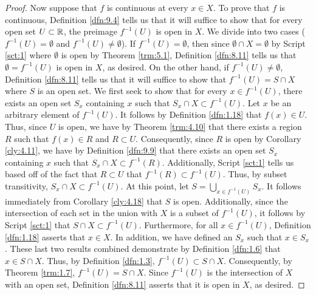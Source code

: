 \documentclass[../main.tex]{subfiles}
\begin{document}
\begin{theorem}
\begin{proof}
        Now suppose that $f$ is continuous at every $x\in X$. To prove that $f$ is continuous, Definition \ref{dfn:9.4} tells us that it will suffice to show that for every open set $U\subset\mathbb{R}$, the preimage $f^{-1}(U)$ is open in $X$. We divide into two cases ($f^{-1}(U)=\emptyset$ and $f^{-1}(U)\neq\emptyset$). If $f^{-1}(U)=\emptyset$, then since $\emptyset\cap X=\emptyset$ by Script \ref{sct:1} where $\emptyset$ is open by Theorem \ref{trm:5.1}, Definition \ref{dfn:8.11} tells us that $\emptyset=f^{-1}(U)$ is open in $X$, as desired. On the other hand, if $f^{-1}(U)\neq\emptyset$, Definition \ref{dfn:8.11} tells us that it will suffice to show that $f^{-1}(U)=S\cap X$ where $S$ is an open set. We first seek to show that for every $x\in f^{-1}(U)$, there exists an open set $S_x$ containing $x$ such that $S_x\cap X\subset f^{-1}(U)$. Let $x$ be an arbitrary element of $f^{-1}(U)$. It follows by Definition \ref{dfn:1.18} that $f(x)\in U$. Thus, since $U$ is open, we have by Theorem \ref{trm:4.10} that there exists a region $R$ such that $f(x)\in R$ and $R\subset U$. Consequently, since $R$ is open by Corollary \ref{cly:4.11}, we have by Definition \ref{dfn:9.9} that there exists an open set $S_x$ containing $x$ such that $S_x\cap X\subset f^{-1}(R)$. Additionally, Script \ref{sct:1} tells us based off of the fact that $R\subset U$ that $f^{-1}(R)\subset f^{-1}(U)$. Thus, by subset transitivity, $S_x\cap X\subset f^{-1}(U)$. At this point, let $S=\bigcup_{x\in f^{-1}(U)}S_x$. It follows immediately from Corollary \ref{cly:4.18} that $S$ is open. Additionally, since the intersection of each set in the union with $X$ is a subset of $f^{-1}(U)$, it follows by Script \ref{sct:1} that $S\cap X\subset f^{-1}(U)$. Furthermore, for all $x\in f^{-1}(U)$, Definition \ref{dfn:1.18} asserts that $x\in X$. In addition, we have defined an $S_x$ such that $x\in S_x$. These last two results combined demonstrate by Definition \ref{dfn:1.6} that $x\in S\cap X$. Thus, by Definition \ref{dfn:1.3}, $f^{-1}(U)\subset S\cap X$. Consequently, by Theorem \ref{trm:1.7}, $f^{-1}(U)=S\cap X$. Since $f^{-1}(U)$ is the intersection of $X$ with an open set, Definition \ref{dfn:8.11} asserts that it is open in $X$, as desired.
    \end{proof}
\end{theorem}
\end{document}
